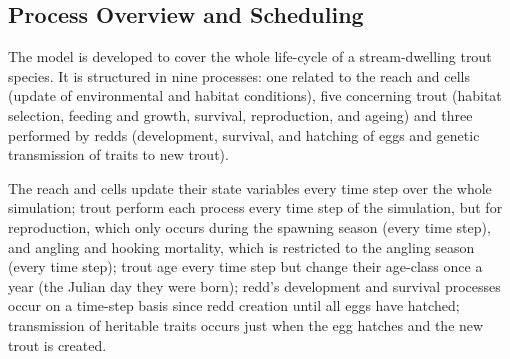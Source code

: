 \subsection{Process Overview and Scheduling}

\begin{guidingbox}
  \begin{tcbitemize}
    \item[\gddarkredb{\arrowbullet}] 
    \item[\gddarkcornflowerblueb{\arrowbullet}] 
    \item[\gddarkgreenb{\arrowbullet}] 
  \end{tcbitemize}
\end{guidingbox}


The model is developed to cover the whole life-cycle of a stream-dwelling trout species. It is structured in nine processes: one related to the reach and cells (update of environmental and habitat conditions), five concerning trout (habitat selection, feeding and growth, survival, reproduction, and ageing) and three performed by redds (development, survival, and hatching of eggs and genetic transmission of traits to new trout).

{
  \color{gddarkcornflowerblueb}
  The reach and cells update their state variables every time step over the whole simulation; trout perform each process every time step of the simulation, but for reproduction, which only occurs during the spawning season (every time step), and angling and hooking mortality, which is restricted to the angling season (every time step); trout age every time step but change their age-class once a year (the Julian day they were born); redd's development and survival processes occur on a time-step basis since redd creation until all eggs have hatched; transmission of heritable traits occurs just when the egg hatches and the new trout is created.
}

